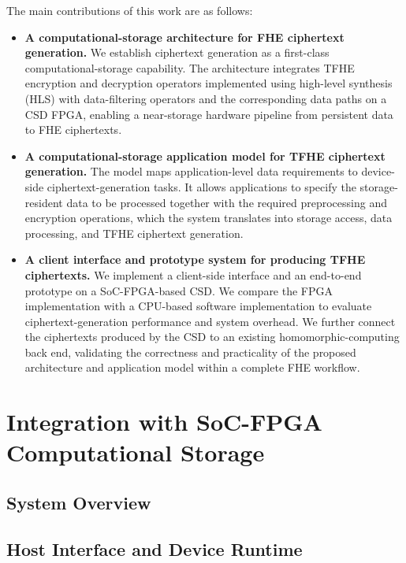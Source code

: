 \documentclass[sigconf,anonymous]{acmart}
\begin{document}
The main contributions of this work are as follows:
\begin{itemize}
  \item \textbf{A computational-storage architecture for FHE ciphertext generation.}
  We establish ciphertext generation as a first-class computational-storage capability. The architecture integrates TFHE encryption and decryption operators implemented using high-level synthesis (HLS) with data-filtering operators and the corresponding data paths on a CSD FPGA, enabling a near-storage hardware pipeline from persistent data to FHE ciphertexts.

  \item \textbf{A computational-storage application model for TFHE ciphertext generation.}
  The model maps application-level data requirements to device-side ciphertext-generation tasks. It allows applications to specify the storage-resident data to be processed together with the required preprocessing and encryption operations, which the system translates into storage access, data processing, and TFHE ciphertext generation.

  \item \textbf{A client interface and prototype system for producing TFHE ciphertexts.}
  We implement a client-side interface and an end-to-end prototype on a SoC-FPGA-based CSD. We compare the FPGA implementation with a CPU-based software implementation to evaluate ciphertext-generation performance and system overhead. We further connect the ciphertexts produced by the CSD to an existing homomorphic-computing back end, validating the correctness and practicality of the proposed architecture and application model within a complete FHE workflow.
\end{itemize}
\endgroup





\section{Integration with SoC-FPGA Computational Storage}

\subsection{System Overview}

\subsection{Host Interface and Device Runtime}
\end{document}
